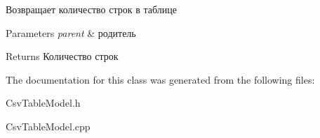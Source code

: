 Возвращает количество строк в таблице 


\begin{DoxyParams}{Parameters}
{\em parent} & родитель \\
\hline
\end{DoxyParams}
\begin{DoxyReturn}{Returns}
Количество строк 
\end{DoxyReturn}


The documentation for this class was generated from the following files\+:\begin{DoxyCompactItemize}
\item 
Csv\+Table\+Model.\+h\item 
Csv\+Table\+Model.\+cpp\end{DoxyCompactItemize}
